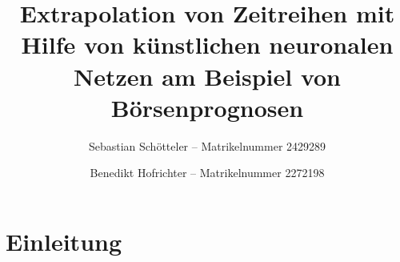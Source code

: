 \documentclass[a4paper,DIV11,bibliography=totoc,headings=normal,ngerman,headsepline]{scrreprt}
\begin{document}
\subject{Seminararbeit}
\title{Extrapolation von Zeitreihen mit Hilfe von künstlichen neuronalen Netzen am Beispiel von Börsenprognosen}
\author{Sebastian Schötteler -- Matrikelnummer 2429289 \and Benedikt Hofrichter -- Matrikelnummer 2272198}
\publishers{Technische Hochschule Nürnberg Georg Simon Ohm}

\maketitle

\tableofcontents
\listoffigures
\listoftables
\listofformels

\chapter{Einleitung} %
\end{document}
